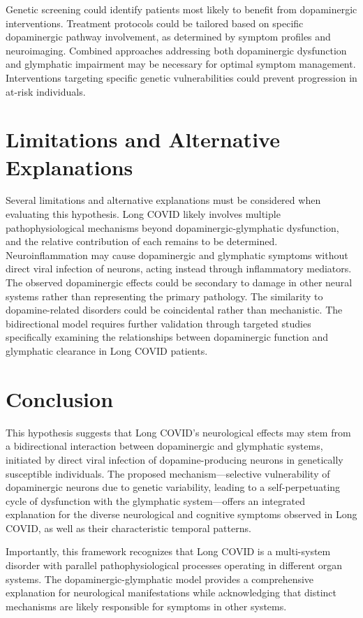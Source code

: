 \documentclass[12pt]{article}
\begin{document}
Genetic screening could identify patients most likely to benefit from dopaminergic interventions. Treatment protocols could be tailored based on specific dopaminergic pathway involvement, as determined by symptom profiles and neuroimaging. Combined approaches addressing both dopaminergic dysfunction and glymphatic impairment may be necessary for optimal symptom management. Interventions targeting specific genetic vulnerabilities could prevent progression in at-risk individuals.

\section{Limitations and Alternative Explanations}

Several limitations and alternative explanations must be considered when evaluating this hypothesis. Long COVID likely involves multiple pathophysiological mechanisms beyond dopaminergic-glymphatic dysfunction, and the relative contribution of each remains to be determined. Neuroinflammation may cause dopaminergic and glymphatic symptoms without direct viral infection of neurons, acting instead through inflammatory mediators. The observed dopaminergic effects could be secondary to damage in other neural systems rather than representing the primary pathology. The similarity to dopamine-related disorders could be coincidental rather than mechanistic. The bidirectional model requires further validation through targeted studies specifically examining the relationships between dopaminergic function and glymphatic clearance in Long COVID patients.

\section{Conclusion}

This hypothesis suggests that Long COVID's neurological effects may stem from a bidirectional interaction between dopaminergic and glymphatic systems, initiated by direct viral infection of dopamine-producing neurons in genetically susceptible individuals. The proposed mechanism—selective vulnerability of dopaminergic neurons due to genetic variability, leading to a self-perpetuating cycle of dysfunction with the glymphatic system—offers an integrated explanation for the diverse neurological and cognitive symptoms observed in Long COVID, as well as their characteristic temporal patterns.

Importantly, this framework recognizes that Long COVID is a multi-system disorder with parallel pathophysiological processes operating in different organ systems. The dopaminergic-glymphatic model provides a comprehensive explanation for neurological manifestations while acknowledging that distinct mechanisms are likely responsible for symptoms in other systems.
\end{document}
